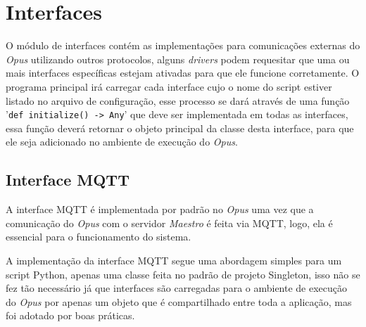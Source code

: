 \section{Interfaces}
\label{opus-sec:interfaces}

O módulo de interfaces contém as implementações para comunicações externas do \emph{Opus} utilizando outros protocolos,
alguns \emph{drivers} podem requesitar que uma ou mais interfaces específicas estejam ativadas para que ele funcione corretamente.
O programa principal irá carregar cada interface cujo o nome do script estiver listado no arquivo de configuração, esse processo
se dará através de uma função '\lstinline{def initialize() -> Any}' que deve ser implementada em todas as interfaces, essa função
deverá retornar o objeto principal da classe desta interface, para que ele seja adicionado no ambiente de execução do \emph{Opus}.

\subsection{Interface MQTT}
\label{opus-sec:interfaces-mqtt}
A interface MQTT é implementada por padrão no \emph{Opus} uma vez que a comunicação do \emph{Opus} com o servidor \emph{Maestro}
é feita via MQTT, logo, ela é essencial para o funcionamento do sistema.

A implementação da interface MQTT segue uma abordagem simples para um script Python, apenas uma classe feita no padrão de 
projeto Singleton, isso não se fez tão necessário já que interfaces são carregadas para o ambiente de execução do 
\emph{Opus} por apenas um objeto que é compartilhado entre toda a aplicação, mas foi adotado por boas práticas.